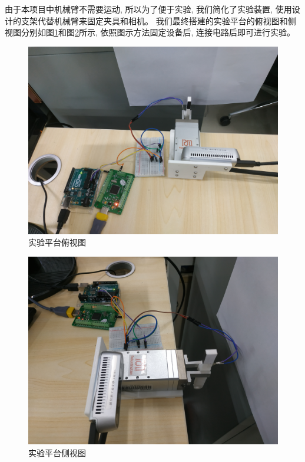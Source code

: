由于本项目中机械臂不需要运动, 所以为了便于实验, 我们简化了实验装置,
使用设计的支架代替机械臂来固定夹具和相机。
我们最终搭建的实验平台的俯视图和侧视图分别如图\ref{fig:exp-1}和图\ref{fig:exp-2}所示,
依照图示方法固定设备后, 连接电路后即可进行实验。

\begin{figure}[!ht]
  \centering
  \includegraphics[width=11.3cm]{chapter04/pic/exp-1}
  \caption{\label{fig:exp-1}
    实验平台俯视图}
  \vspace{-0.3cm}
\end{figure}

\begin{figure}[!ht]
  \centering
  \includegraphics[width=11.3cm]{chapter04/pic/exp-2}
  \caption{\label{fig:exp-2}
    实验平台侧视图}
  \vspace{-0.3cm}
\end{figure}


